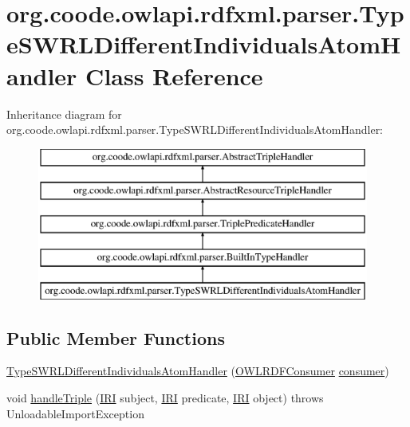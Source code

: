 \hypertarget{classorg_1_1coode_1_1owlapi_1_1rdfxml_1_1parser_1_1_type_s_w_r_l_different_individuals_atom_handler}{\section{org.\-coode.\-owlapi.\-rdfxml.\-parser.\-Type\-S\-W\-R\-L\-Different\-Individuals\-Atom\-Handler Class Reference}
\label{classorg_1_1coode_1_1owlapi_1_1rdfxml_1_1parser_1_1_type_s_w_r_l_different_individuals_atom_handler}
}
Inheritance diagram for org.\-coode.\-owlapi.\-rdfxml.\-parser.\-Type\-S\-W\-R\-L\-Different\-Individuals\-Atom\-Handler\-:\begin{figure}[H]
\begin{center}
\leavevmode
\includegraphics[height=5.000000cm]{classorg_1_1coode_1_1owlapi_1_1rdfxml_1_1parser_1_1_type_s_w_r_l_different_individuals_atom_handler}
\end{center}
\end{figure}
\subsection*{Public Member Functions}
\begin{DoxyCompactItemize}
\item 
\hyperlink{classorg_1_1coode_1_1owlapi_1_1rdfxml_1_1parser_1_1_type_s_w_r_l_different_individuals_atom_handler_a1104e7d71a13c8e60c809b468d6024cb}{Type\-S\-W\-R\-L\-Different\-Individuals\-Atom\-Handler} (\hyperlink{classorg_1_1coode_1_1owlapi_1_1rdfxml_1_1parser_1_1_o_w_l_r_d_f_consumer}{O\-W\-L\-R\-D\-F\-Consumer} \hyperlink{classorg_1_1coode_1_1owlapi_1_1rdfxml_1_1parser_1_1_abstract_triple_handler_a4ccf4d898ff01eb1cadfa04b23d54e9c}{consumer})
\item 
void \hyperlink{classorg_1_1coode_1_1owlapi_1_1rdfxml_1_1parser_1_1_type_s_w_r_l_different_individuals_atom_handler_a43ebebdc4651a460bc4bb9a9190f1435}{handle\-Triple} (\hyperlink{classorg_1_1semanticweb_1_1owlapi_1_1model_1_1_i_r_i}{I\-R\-I} subject, \hyperlink{classorg_1_1semanticweb_1_1owlapi_1_1model_1_1_i_r_i}{I\-R\-I} predicate, \hyperlink{classorg_1_1semanticweb_1_1owlapi_1_1model_1_1_i_r_i}{I\-R\-I} object)  throws Unloadable\-Import\-Exception 
\end{DoxyCompactItemize}
